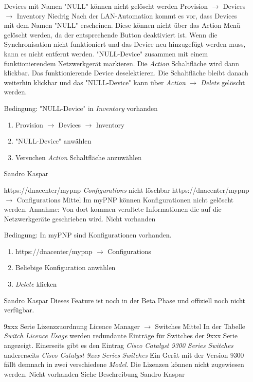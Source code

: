 \bugreport
{Devices mit Namen "NULL" können nicht gelöscht werden}
{Provision $\rightarrow$ Devices $\rightarrow$ Inventory}
{Niedrig}
{Nach der LAN-Automation kommt es vor, dass Devices mit dem Namen "NULL" erscheinen. Diese können nicht über das Action Menü gelöscht werden, da der entsprechende Button deaktiviert ist.}
{Wenn die Synchronisation nicht funktioniert und das Device neu hinzugefügt werden muss, kann es nicht entfernt werden.}
{"NULL-Device" zusammen mit einem funktionierendem Netzwerkgerät markieren. Die \textit{Action} Schaltfläche wird dann klickbar. Das funktionierende Device deselektieren. Die Schaltfläche bleibt danach weiterhin klickbar und das "NULL-Device" kann über \textit{Action} $\rightarrow$ \textit{Delete} gelöscht werden.}
{
	Bedingung: "NULL-Device" in \textit{Inventory} vorhanden
	\begin{enumerate}
		\item Provision $\rightarrow$ Devices $\rightarrow$ Inventory
		\item "NULL-Device" anwählen
		\item Versuchen \textit{Action} Schaltfläche anzuwählen
	\end{enumerate}
}
{Sandro Kaspar}
{}

\bugreport
{https://dnacenter/mypnp \textit{Configurations} nicht löschbar}
{https://dnacenter/mypnp $\rightarrow$ Configurations}
{Mittel}
{Im myPNP können Konfigurationen nicht gelöscht werden.}
{Annahme: Von dort kommen veraltete Informationen die auf die Netzwerkgeräte geschrieben wird.}
{Nicht vorhanden}
{
	Bedingung: In myPNP sind Konfigurationen vorhanden.
	\begin{enumerate}
		\item https://dnacenter/mypnp $\rightarrow$ Configurations
		\item Beliebige Konfiguration anwählen
		\item \textit{Delete} klicken
	\end{enumerate}
}
{Sandro Kaspar}
{Dieses Feature ist noch in der Beta Phase und offiziell noch nicht verfügbar.}


\bugreport
{9xxx Serie Lizenzzuordnung}
{Licence Manager $\rightarrow$ Switches}
{Mittel}
{In der Tabelle \textit{Switch Licence Usage} werden redundante Einträge für Switches der 9xxx Serie angezeigt. Einerseits gibt es den Eintrag \textit{Cisco Catalyst 9300 Series Switches} andererseits \textit{Cisco Catalyst 9xxx Series Switches} Ein Gerät mit der Version 9300 fällt demnach in zwei verschiedene \textit{Model}.}
{Die Lizenzen können nicht zugewiesen werden.}
{Nicht vorhanden}
{
Siehe Beschreibung
}
{Sandro Kaspar}
{}


